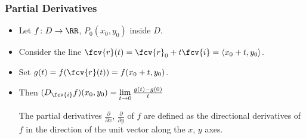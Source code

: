 \begin{frame}
\frametitle{Partial Derivatives}
\begin{itemize} 
\item Let $f\colon D \to \RR$,  $P_0(x_0,y_0)$ inside $D$.
\item<2-> Consider the line $\fcv{r}(t) = \fcv{r}_0 + t\fcv {i} = \langle x_0+t, y_0 \rangle$.
\item<3-> Set $g(t) = f(\fcv{r}(t)) = f(x_0+t, y_0)$.
\item<4-> Then $(D_{\fcv{i}} f)(x_0,y_0) = \lim\limits_{t\to 0} \frac{g(t)-g(0)}{t}$
\begin{definition}
The partial derivatives $\frac{\partial}{\partial x} $, $\frac{\partial}{\partial y} $  of $f$ are defined as the directional derivatives of $f$ in the direction of the unit vector along the $x$, $y$ axes. 
\end{definition}
\end{itemize}
\end{frame}
